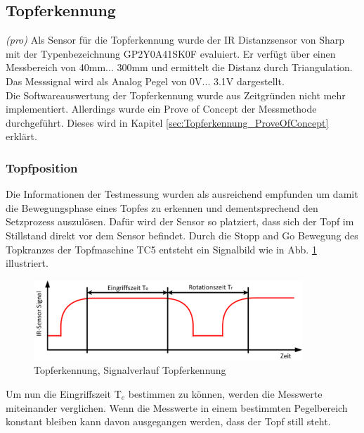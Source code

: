 \subsection{Topferkennung} \label{sec:Topferkennung}
\textit{(pro)} Als Sensor für die Topferkennung wurde der IR Distanzsensor von Sharp mit der Typenbezeichnung GP2Y0A41SK0F evaluiert. Er verfügt über einen Messbereich von 40mm... 300mm und ermittelt die Distanz durch Triangulation. Das Messsignal wird als Analog Pegel von 0V... 3.1V dargestellt.\\
Die Softwareauswertung der Topferkennung wurde aus Zeitgründen nicht mehr implementiert. Allerdings wurde ein Prove of Concept der Messmethode durchgeführt. Dieses wird in Kapitel \ref{sec:Topferkennung_ProveOfConcept} erklärt.



\subsubsection{Topfposition}
Die Informationen der Testmessung wurden als ausreichend empfunden um damit die Bewegungsphase eines Topfes zu erkennen und dementsprechend den Setzprozess auszulösen. Dafür wird der Sensor so platziert, dass sich der Topf im Stillstand direkt vor dem Sensor befindet. Durch die Stopp and Go Bewegung des Topkranzes der Topfmaschine TC5 entsteht ein Signalbild wie in Abb. \ref{fig:Signalbild_Topferkennung} illustriert.\\

\begin{figure}[H]
	\includegraphics[width=0.9\textwidth]{Illustrationen/6-Umsetzung/Topferkennung_Messsignal.png}
	\caption{Topferkennung, Signalverlauf Topferkennung}
	\label{fig:Signalbild_Topferkennung}
\end{figure}

Um nun die Eingriffszeit T$_{e}$ bestimmen zu können, werden die Messwerte miteinander verglichen. Wenn die Messwerte in einem bestimmten Pegelbereich konstant bleiben kann davon ausgegangen werden, dass der Topf still steht.

